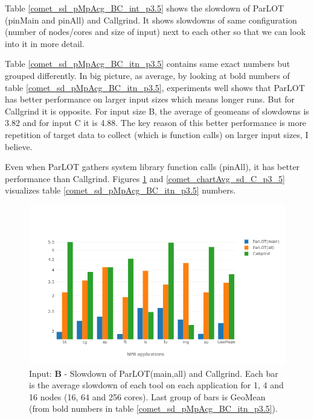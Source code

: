 





Table \ref{comet_sd_pMpAcg_BC_int_p3.5} shows the slowdown of ParLOT (pinMain and pinAll) and Callgrind. It shows slowdowns of same configuration (number of nodes/cores and size of input) next to each other so that we can look into it in more detail.


Table \ref{comet_sd_pMpAcg_BC_itn_p3.5} contains same exact numbers but grouped differently. In big picture, as average, by looking at bold numbers of table \ref{comet_sd_pMpAcg_BC_itn_p3.5}, experiments well shows that ParLOT has better performance on larger input sizes which means longer runs. But for Callgrind it is opposite. For input size B, the average of geomeans of slowdowns is 3.82 and for input C it is 4.88. The key reason of this better performance is more repetition of target data to collect (which is function calls) on larger input sizes, I believe. 

Even when ParLOT gathers system library function calls (pinAll), it has better performance than Callgrind. Figures \ref{comet_chartAvg_sd_B_p3_5} and \ref{comet_chartAvg_sd_C_p3_5} visualizes table \ref{comet_sd_pMpAcg_BC_itn_p3.5} numbers.


\begin{figure}[!t]
\centering
\includegraphics[width=6in]{figs.comet/comet_chartAvg_sd_B_p3_5.png}
\caption{ Input: \textbf{B} - Slowdown of ParLOT(main,all) and Callgrind. Each bar is the average slowdown of each tool on each application for 1, 4 and 16 nodes (16, 64 and 256 cores). Last group of bars is GeoMean (from bold numbers in table \ref{comet_sd_pMpAcg_BC_itn_p3.5}). 
}
\label{comet_chartAvg_sd_B_p3_5}
\end{figure}


